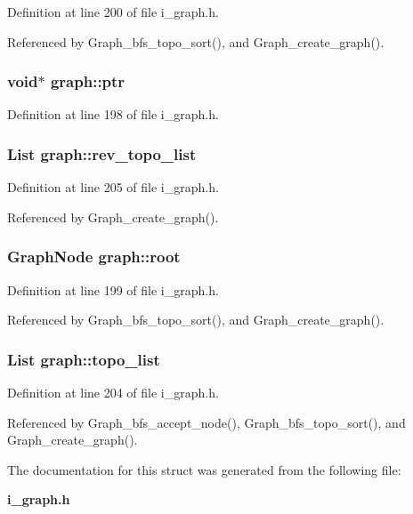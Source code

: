 Definition at line 200 of file i\_\-graph.h.

Referenced by Graph\_\-bfs\_\-topo\_\-sort(), and Graph\_\-create\_\-graph().
\subsubsection{\setlength{\rightskip}{0pt plus 5cm}void$\ast$ \bf{graph::ptr}}\label{structgraph_16d8a56d780d4d1b04061a4d439ee149}




Definition at line 198 of file i\_\-graph.h.
\subsubsection{\setlength{\rightskip}{0pt plus 5cm}\bf{List} \bf{graph::rev\_\-topo\_\-list}}\label{structgraph_fd5c00644b4454bf379366a9498a4148}




Definition at line 205 of file i\_\-graph.h.

Referenced by Graph\_\-create\_\-graph().
\subsubsection{\setlength{\rightskip}{0pt plus 5cm}\bf{Graph\-Node} \bf{graph::root}}\label{structgraph_64110066af3c4f467f847a7588434b1d}




Definition at line 199 of file i\_\-graph.h.

Referenced by Graph\_\-bfs\_\-topo\_\-sort(), and Graph\_\-create\_\-graph().
\subsubsection{\setlength{\rightskip}{0pt plus 5cm}\bf{List} \bf{graph::topo\_\-list}}\label{structgraph_54355d1bf9af5d2319efa7d508b0adc7}




Definition at line 204 of file i\_\-graph.h.

Referenced by Graph\_\-bfs\_\-accept\_\-node(), Graph\_\-bfs\_\-topo\_\-sort(), and Graph\_\-create\_\-graph().

The documentation for this struct was generated from the following file:\begin{CompactItemize}
\item 
\bf{i\_\-graph.h}\end{CompactItemize}
